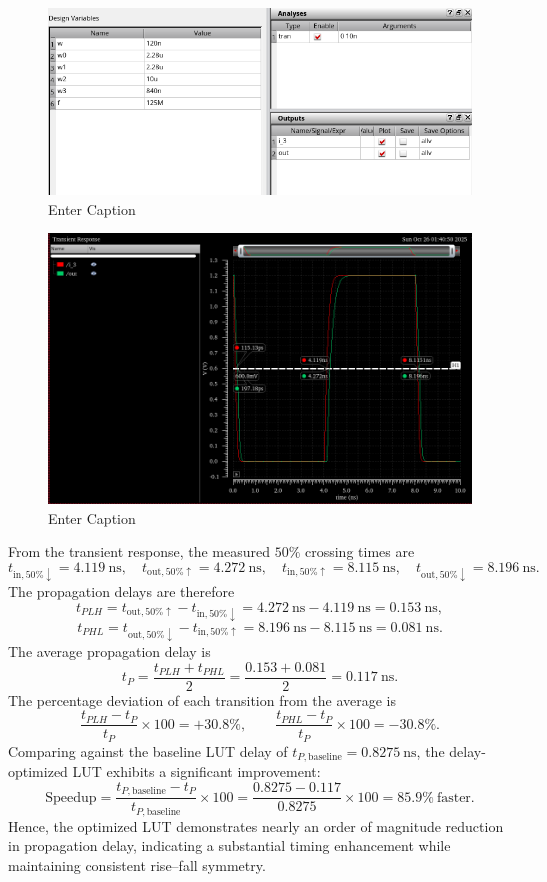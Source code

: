 \documentclass[12pt]{article}
\begin{document}
\begin{figure}[H]
    \centering
    \includegraphics[width=\linewidth]{writeup//figures/optimized_delay_ADEL_setup.png}
    \caption{Enter Caption}
\end{figure}

\begin{figure}[H]
    \centering
    \includegraphics[width=0.5\linewidth]{writeup//figures/updated_delay_opt.png}
    \caption{Enter Caption}
\end{figure}
From the transient response, the measured $50\%$ crossing times are
\[
t_{\text{in},50\%\downarrow} = 4.119~\text{ns}, \quad
t_{\text{out},50\%\uparrow} = 4.272~\text{ns}, \quad
t_{\text{in},50\%\uparrow} = 8.115~\text{ns}, \quad
t_{\text{out},50\%\downarrow} = 8.196~\text{ns}.
\]
The propagation delays are therefore
\[
t_{PLH} = t_{\text{out},50\%\uparrow} - t_{\text{in},50\%\downarrow}
        = 4.272~\text{ns} - 4.119~\text{ns}
        = \boxed{0.153~\text{ns}},
\]
\[
t_{PHL} = t_{\text{out},50\%\downarrow} - t_{\text{in},50\%\uparrow}
        = 8.196~\text{ns} - 8.115~\text{ns}
        = \boxed{0.081~\text{ns}}.
\]
The average propagation delay is
\[
t_P = \frac{t_{PLH} + t_{PHL}}{2}
     = \frac{0.153 + 0.081}{2}
     = \boxed{0.117~\text{ns}}.
\]
The percentage deviation of each transition from the average is
\[
\frac{t_{PLH} - t_P}{t_P} \times 100 = \boxed{+30.8\%}, 
\qquad
\frac{t_{PHL} - t_P}{t_P} \times 100 = \boxed{-30.8\%}.
\]
Comparing against the baseline LUT delay of $t_{P,\text{baseline}} = 0.8275~\text{ns}$, the delay-optimized LUT exhibits a significant improvement:
\[
\text{Speedup} 
= \frac{t_{P,\text{baseline}} - t_P}{t_{P,\text{baseline}}} \times 100
= \frac{0.8275 - 0.117}{0.8275} \times 100
= \boxed{85.9\%~\text{faster}}.
\]
Hence, the optimized LUT demonstrates nearly an order of magnitude reduction in propagation delay, indicating a substantial timing enhancement while maintaining consistent rise–fall symmetry.
\end{document}

